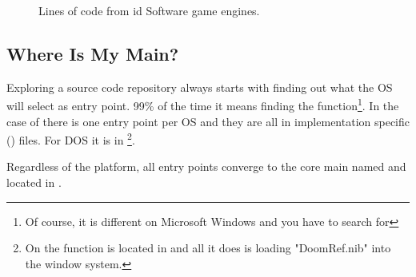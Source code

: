 \par
\begin{figure}[H]
\centering
   \caption{Lines of code from id Software game engines.}
 \end{figure}
\par

\subsection{Where Is My Main?}
Exploring a source code repository always starts with finding out what the OS will select as entry point. 99\% of the time it means finding the  function\footnote{Of course, it is different on Microsoft Windows and you have to search for }. In the case of \doom{} there is one entry point per OS and they are all in implementation specific () files. For DOS it is in \footnote{On \NeXT the  function is located in  and all it does is loading "DoomRef.nib" into the window system.}.\\
\par
Regardless of the platform, all entry points converge to the core main named  and located in .\\ 
\par

